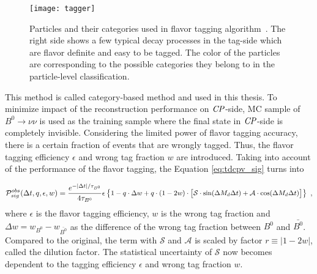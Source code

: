 \begin{figure}[H]
\centering
\texttt{[image: tagger]}
\caption{Particles and their categories used in flavor tagging algorithm~\cite{abudinen2020first}. The right side shows a few typical decay processes in the tag-side which are flavor definite and easy to be tagged. The color of the particles are corresponding to the possible categories they belong to in the particle-level classification.}
\label{fig:flavortagger}
\end{figure}
 

This method is called category-based method and used in this thesis. To minimize impact of the reconstruction performance on $\it{CP}$-side, MC sample of $B^0 \to \nu \nu$ is used as the training sample where the final state in $\it{CP}$-side is completely invisible. 
Considering the limited power of flavor tagging accuracy, there is a certain fraction of events that are wrongly tagged. Thus, the flavor tagging efficiency $\epsilon$ and wrong tag fraction $w$ are introduced. Taking into account of the performance of the flavor tagging, the Equation \ref{eq:tdcpv_sig} turns into %

\begin{equation}\label{eq:tdcpv_all_ft}
\small
\mathcal{P}_{sig}^{obs}(\Delta t, q, \epsilon, w) = 
\frac{e^{-|\Delta t|/\tau_{B^0}}}{4\tau_{B^0}}
\epsilon
\begin{Bmatrix}
1 - q\cdot \Delta w+ q\cdot(1-2w)\cdot 
\begin{bmatrix}
\mathcal{S}\cdot\text{sin}(\Delta M_d \Delta t) + 
\mathcal{A}\cdot\text{cos}(\Delta M_d \Delta t)
\end{bmatrix}
\end{Bmatrix}~,
\end{equation} 
where $\epsilon$ is the flavor tagging efficiency, $w$ is the wrong tag fraction and $\Delta w = w_{B^0}-w_{\bar{B^0}}$ as the difference of the wrong tag fraction between $B^0$ and $\bar{B^0}$.
Compared to the original, the term with $\mathcal{S}$ and $\mathcal{A}$ is scaled by factor $r\equiv |1-2w|$, called  the dilution factor. The statistical uncertainty of $\mathcal{S}$ now becomes dependent to the tagging efficiency $\epsilon$ and wrong tag fraction $w$. 

